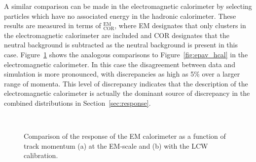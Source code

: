 A similar comparison can be made in the electromagnetic calorimeter by selecting particles which have no associated energy in the hadronic calorimeter. 
These results are measured in terms of \epav$_{\mathrm{COR}}^{\mathrm{EM}}$, where EM designates that only clusters in the electromagnetic calorimeter are included and COR designates that the neutral background is subtracted as the neutral background is present in this case.
Figure~\ref{fig:epcor_ecal} shows the analogous comparisons to Figure~\ref{fig:epav_hcal} in the electromagnetic calorimeter.
In this case the disagreement between data and simulation is more pronounced, with discrepancies as high as 5\% over a larger range of momenta.
This level of discrepancy indicates that the description of the electromagnetic calorimeter is actually the dominant source of discrepancy in the combined distributions in Section~\ref{sec:response}. 

\begin{figure}[htbp]
\centering
{}
~
\caption{Comparison of the response of the EM calorimeter as a function of track momentum (a) at the EM-scale and (b) with the LCW calibration.}
\label{fig:epcor_ecal}
\end{figure}


